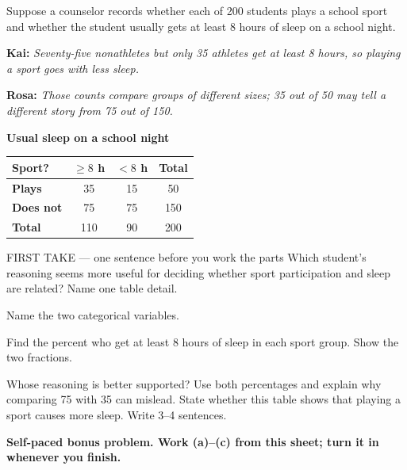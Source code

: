 \documentclass[14pt]{extarticle}
\begin{document}
\pagestyle{empty}


\noindent\begin{minipage}[t]{0.57\linewidth}
\vspace{0pt}
Suppose a counselor records whether each of 200 students plays a school sport and whether the student usually gets at least 8 hours of sleep on a school night.\par\smallskip \textbf{Kai:} \emph{Seventy-five nonathletes but only 35 athletes get at least 8 hours, so playing a sport goes with less sleep.}\par \textbf{Rosa:} \emph{Those counts compare groups of different sizes; 35 out of 50 may tell a different story from 75 out of 150.}\par
\end{minipage}\hfill
\begin{minipage}[t]{0.40\linewidth}
\vspace{0pt}
\begin{center}
\textbf{Usual sleep on a school night}\par\smallskip
\begin{tabular}{|l|c|c|c|}
\hline
\textbf{Sport?} & \textbf{$\geq 8$ h} & \textbf{$<8$ h} & \textbf{Total} \\ \hline
\textbf{Plays} & 35 & 15 & 50 \\ \hline
\textbf{Does not} & 75 & 75 & 150 \\ \hline
\textbf{Total} & 110 & 90 & 200 \\ \hline
\end{tabular}
\end{center}
\end{minipage}

\begin{firsttakebox}{FIRST TAKE --- one sentence before you work the parts}
Which student's reasoning seems more useful for deciding whether sport participation and sleep are related? Name one table detail.
\end{firsttakebox}

\begin{description}[leftmargin=1.15in, labelwidth=1in, itemsep=2pt, topsep=2pt]
  \item[\dokbadge{1}~(a)] Name the two categorical variables.
  \item[\dokbadge{2}~(b)] Find the percent who get at least 8 hours of sleep in each sport group. Show the two fractions.
  \item[\dokbadge{3}~(c)] Whose reasoning is better supported? Use both percentages and explain why comparing 75 with 35 can mislead. State whether this table shows that playing a sport causes more sleep. Write 3--4 sentences.
\end{description}

\vfill
\textbf{Self-paced bonus problem. Work (a)--(c) from this sheet; turn it in whenever you finish.}
\end{document}
